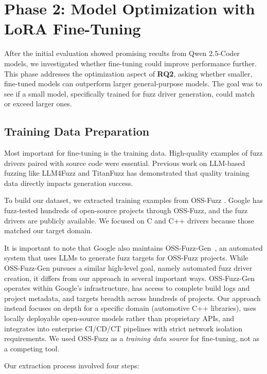 \section{Phase 2: Model Optimization with LoRA Fine-Tuning}
\label{sec:impl_phase2}

After the initial evaluation showed promising results from Qwen 2.5-Coder models, we investigated whether fine-tuning could improve performance further. This phase addresses the optimization aspect of \textbf{RQ2}, asking whether smaller, fine-tuned models can outperform larger general-purpose models. The goal was to see if a small model, specifically trained for fuzz driver generation, could match or exceed larger ones.

\subsection{Training Data Preparation}

Most important for fine-tuning is the training data. High-quality examples of fuzz drivers paired with source code were essential. Previous work on LLM-based fuzzing like LLM4Fuzz \cite{llm4fuzz} and TitanFuzz \cite{TitanFuzz2022} has demonstrated that quality training data directly impacts generation success.

To build our dataset, we extracted training examples from OSS-Fuzz \cite{OSSFuzzBugs2021}. Google has fuzz-tested hundreds of open-source projects through OSS-Fuzz, and the fuzz drivers are publicly available. We focused on C and C++ drivers because those matched our target domain.

It is important to note that Google also maintains OSS-Fuzz-Gen~\cite{ossfuzzgen}, an automated system that uses LLMs to generate fuzz targets for OSS-Fuzz projects. While OSS-Fuzz-Gen pursues a similar high-level goal, namely automated fuzz driver creation, it differs from our approach in several important ways. OSS-Fuzz-Gen operates within Google's infrastructure, has access to complete build logs and project metadata, and targets breadth across hundreds of projects. Our approach instead focuses on depth for a specific domain (automotive C++ libraries), uses locally deployable open-source models rather than proprietary APIs, and integrates into enterprise CI/CD/CT pipelines with strict network isolation requirements. We used OSS-Fuzz as a \emph{training data source} for fine-tuning, not as a competing tool.

Our extraction process involved four steps:

